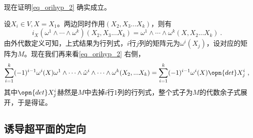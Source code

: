 现在证明\autoref{eq_orihyp_2} 确实成立。

设$X_i\in V,X=X_1$。两边同时作用$(X_2,X_3...X_k)$，则有
\begin{equation}
i_X(\omega^1\wedge\cdots\wedge\omega^k)(X_2,X_3...X_k)=\omega^1\wedge\cdots\wedge\omega^k(X,X_2...X_k)~.
\end{equation}
由外代数定义可知，上式结果为行列式，$i$行$j$列的矩阵元为$\omega^i(X_j)$，设对应的矩阵为$M$。现在我们再来看\autoref{eq_orihyp_2} 右侧，
\begin{equation}
\begin{aligned}
\sum_{i=1}^k(-1)^{i-1} \omega^i(X) \omega^1 \wedge \cdots \wedge \hat{\omega}^i \wedge \cdots \wedge \omega^k(X_2,...X_k)=\sum_{i=1}^k(-1)^{i-1} \omega^i(X) \opn{det}X^i_j~,
\end{aligned}
\end{equation}
其中$\opn{det}X^i_j$赫然是$M$中去掉$i$行$1$列的行列式，整个式子为$M$的代数余子式展开，于是得证。
\subsection{诱导超平面的定向}